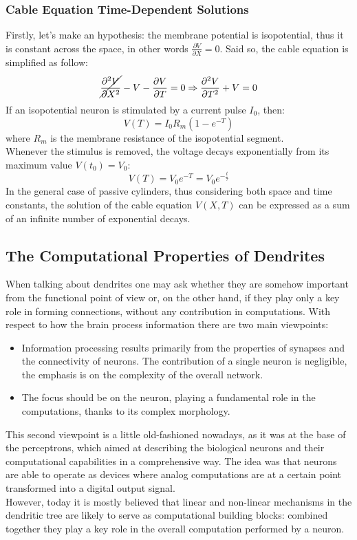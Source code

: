 \subsubsection{Cable Equation Time-Dependent Solutions}
Firstly, let's make an hypothesis: the membrane potential is isopotential, thus it
is constant across the space, in other words \(\frac{\partial{V}}{\partial{X}}=0\).
Said so, the cable equation is simplified as follow:
\begin{equation*}
    \cancel{\frac{\partial^{2}{V}}{\partial{X^{2}}}}-V-\frac{\partial{V}}{\partial{T}}=0
    \Rightarrow
    \frac{\partial^{2}{V}}{\partial{T^{2}}}+V=0
\end{equation*}
If an isopotential neuron is stimulated by a current pulse \(I_{0}\), then:
\begin{equation*}
    V(T)=I_{0}R_{m}(1-e^{-T})
\end{equation*}
where \(R_{m}\) is the membrane resistance of the isopotential segment.\\
Whenever the stimulus is removed, the voltage decays exponentially from
its maximum value \(V(t_{0})=V_{0}\):
\begin{equation*}
    V(T)=V_{0}e^{-T}=V_{0}e^{-\frac{t}{\tau}}
\end{equation*}
In the general case of passive cylinders, thus considering both space and
time constants, the solution of the cable equation \(V(X,T)\) can be expressed as
a sum of an infinite number of exponential decays.

\subsection{The Computational Properties of Dendrites}
When talking about dendrites one may ask whether they are somehow
important from the functional point of view or, on the other hand,
if they play only a key role in forming connections, without any
contribution in computations. With respect to how the brain process
information there are two main viewpoints:
\begin{itemize}
    \item Information processing results primarily from the properties of
    synapses and the connectivity of neurons. The contribution of a single
    neuron is negligible, the emphasis is on the complexity of the overall
    network.
    \item The focus should be on the neuron, playing a fundamental role in the
    computations, thanks to its complex morphology.
\end{itemize}
This second viewpoint is a little old-fashioned nowadays, as it was at the base
of the perceptrons, which aimed at describing the biological neurons and their
computational capabilities in a comprehensive way. The idea was that neurons are
able to operate as devices where analog computations are at a certain point
transformed into a digital output signal.\\
However, today it is mostly believed that linear and non-linear mechanisms
in the dendritic tree are likely to serve as computational building blocks:
combined together they play a key role in the overall computation performed
by a neuron.
